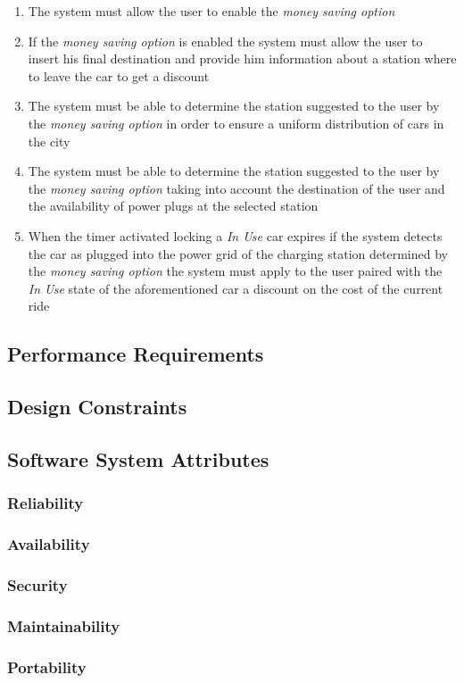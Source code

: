 \begin{description}
  			\begin{enumerate}[resume*]
  				\item The system must allow the user to enable the \emph{money saving option}
  				\item If the  \emph{money saving option} is enabled the system must allow the user
  				to insert his final destination and provide him information about a station where to
  				leave the car to get a discount
  				\item The system must be able to determine the station suggested to the user by the
  				\emph{money saving option} in order to ensure a uniform distribution of cars in the
  				city
  				\item The system must be able to determine the station suggested to the user by the
  				\emph{money saving option} taking into account the destination of the user and
  				the availability of power plugs at the selected station
  				\item When the timer activated locking a \emph{In Use} car expires if the system
  				detects the car as plugged into the power grid of the charging station determined by
  				the \emph{money saving option} the system must apply to the user paired with the
  				\emph{In Use} state of the aforementioned car a discount on the cost of
  				the current ride		
   			\end{enumerate}
  	\end{description}
  	
\subsection{Performance Requirements}
\subsection{Design Constraints}
\subsection{Software System Attributes}
	\subsubsection{Reliability}
	\subsubsection{Availability}
	\subsubsection{Security}
	\subsubsection{Maintainability}
	\subsubsection{Portability}

